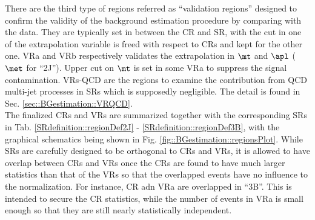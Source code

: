 There are the third type of regions referred as ``validation regions'' designed to confirm the validity of the background estimation procedure by comparing with the data. They are typically set in between the CR and SR, with the cut in one of the extrapolation variable is freed with respect to CRs and kept for the other one. VRa and VRb respectively validates the extrapolation in $\mt$ and $\apl$ ($\met$ for ``2J''). Upper cut on $\mt$ is set in some VRa to suppress the signal contamination. VRs-QCD are the regions to examine the contribution from QCD multi-jet processes in SRs which is supposedly negligible. The detail is found in Sec. \ref{sec::BGestimation::VRQCD}. \\

The finalized CRs and VRs are summarized together with the corresponding SRs in Tab. \ref{SRdefinition::regionDef2J} - \ref{SRdefinition::regionDef3B}, with the graphical schematics being shown in Fig. \ref{fig::BGestimation::regionsPlot}. While SRs are carefully designed to be orthogonal to CRs and VRs, it is allowed to have overlap between CRs and VRs once the CRs are found to have much larger statistics than that of the VRs so that the overlapped events have no influence to the normalization. For instance, CR adn VRa are overlapped in ``3B''. This is intended to secure the CR statistics, while the number of events in VRa is small enough so that they are still nearly statistically independent. \\
\clearpage

